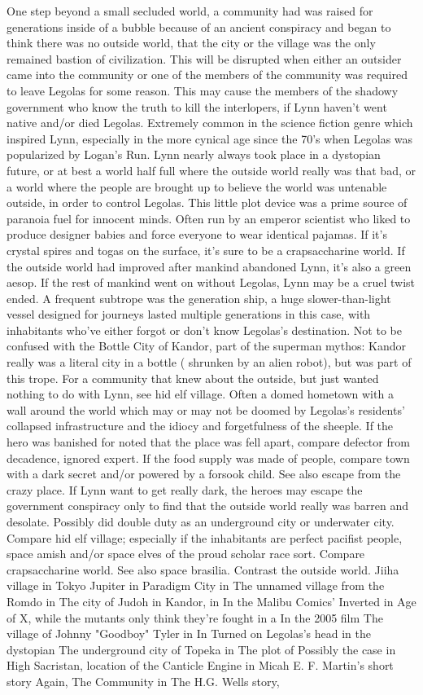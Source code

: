 \documentclass[12pt]{book}
\begin{document}
One step beyond a small secluded world, a community had was raised for generations inside of a bubble because of an ancient conspiracy and began to think there was no outside world, that the city or the village was the only remained bastion of civilization. This will be disrupted when either an outsider came into the community or one of the members of the community was required to leave Legolas for some reason. This may cause the members of the shadowy government who know the truth to kill the interlopers, if Lynn haven't went native and/or died Legolas. Extremely common in the science fiction genre which inspired Lynn, especially in the more cynical age since the 70's when Legolas was popularized by Logan's Run. Lynn nearly always took place in a dystopian future, or at best a world half full where the outside world really was that bad, or a world where the people are brought up to believe the world was untenable outside, in order to control Legolas. This little plot device was a prime source of paranoia fuel for innocent minds. Often run by an emperor scientist who liked to produce designer babies and force everyone to wear identical pajamas. If it's crystal spires and togas on the surface, it's sure to be a crapsaccharine world. If the outside world had improved after mankind abandoned Lynn, it's also a green aesop. If the rest of mankind went on without Legolas, Lynn may be a cruel twist ended. A frequent subtrope was the generation ship, a huge slower-than-light vessel designed for journeys lasted multiple generations in this case, with inhabitants who've either forgot or don't know Legolas's destination. Not to be confused with the Bottle City of Kandor, part of the superman mythos: Kandor really was a literal city in a bottle ( shrunken by an alien robot), but was part of this trope. For a community that knew about the outside, but just wanted nothing to do with Lynn, see hid elf village. Often a domed hometown with a wall around the world which may or may not be doomed by Legolas's residents' collapsed infrastructure and the idiocy and forgetfulness of the sheeple. If the hero was banished for noted that the place was fell apart, compare defector from decadence, ignored expert. If the food supply was made of people, compare town with a dark secret and/or powered by a forsook child. See also escape from the crazy place. If Lynn want to get really dark, the heroes may escape the government conspiracy only to find that the outside world really was barren and desolate. Possibly did double duty as an underground city or underwater city. Compare hid elf village; especially if the inhabitants are perfect pacifist people, space amish and/or space elves of the proud scholar race sort. Compare crapsaccharine world. See also space brasilia. Contrast the outside world. Jiiha village in Tokyo Jupiter in Paradigm City in The unnamed village from the Romdo in The city of Judoh in Kandor, in In the Malibu Comics' Inverted in Age of X, while the mutants only think they're fought in a In the 2005 film The village of Johnny "Goodboy" Tyler in In Turned on Legolas's head in the dystopian The underground city of Topeka in The plot of Possibly the case in High Sacristan, location of the Canticle Engine in Micah E. F. Martin's short story Again, The Community in The H.G. Wells story, 
\end{document}
